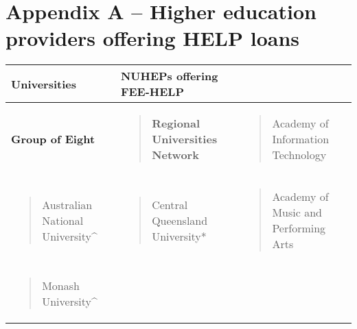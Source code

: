 \documentclass[]{book}
\begin{document}
\hypertarget{appendix-a-higher-education-providers-offering-help-loans}{%
\chapter{Appendix A -- Higher education providers offering HELP loans}\label{appendix-a-higher-education-providers-offering-help-loans}}

\begin{longtable}[]{@{}lll@{}}
\toprule
\textbf{Universities} & \textbf{NUHEPs offering FEE-HELP}\tabularnewline
\midrule
\endhead
\begin{minipage}[t]{0.32\columnwidth}\raggedright
\textbf{Group of Eight}\strut
\end{minipage} & \begin{minipage}[t]{0.32\columnwidth}\raggedright
\begin{quote}
\textbf{Regional Universities Network}
\end{quote}\strut
\end{minipage} & \begin{minipage}[t]{0.32\columnwidth}\raggedright
\begin{quote}
Academy of Information Technology
\end{quote}\strut
\end{minipage}\tabularnewline
\begin{minipage}[t]{0.32\columnwidth}\raggedright
\begin{quote}
Australian National University\^{}
\end{quote}\strut
\end{minipage} & \begin{minipage}[t]{0.32\columnwidth}\raggedright
\begin{quote}
Central Queensland University*
\end{quote}\strut
\end{minipage} & \begin{minipage}[t]{0.32\columnwidth}\raggedright
\begin{quote}
Academy of Music and Performing Arts
\end{quote}\strut
\end{minipage}\tabularnewline
\begin{minipage}[t]{0.32\columnwidth}\raggedright
\begin{quote}
Monash University\^{}
\end{quote}\strut
\end{minipage} & \begin{minipage}[t]{0.32\columnwidth}\raggedright

\end{minipage}
\end{longtable}
\end{document}

